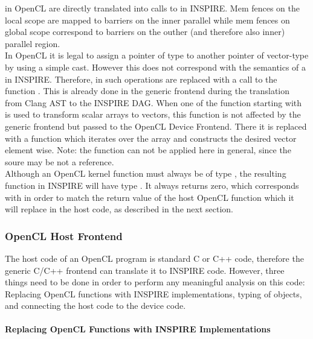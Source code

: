  in OpenCL are directly translated into calls to  in INSPIRE. Mem fences on the local scope are mapped to barriers on the inner parallel while mem fences on global scope correspond to barriers on the outher (and therefore also inner) parallel region. \\

In OpenCL it is legal to assign a pointer of type  to another pointer of vector-type  by using a simple cast. However this does not correspond with the semantics of a  in INSPIRE. Therefore, in such operations are replaced with a call to the function . This is already done in the generic frontend during the translation from Clang AST to the INSPIRE DAG. When one of the function starting with  is used to transform scalar arrays to vectors, this function is not affected by the generic frontend but passed to the OpenCL Device Frontend. There it is replaced with a function which iterates over the array and constructs the desired vector element wise. Note: the function  can not be applied here in general, since the soure may be not a reference. \\

Although an OpenCL kernel function must always be of type , the resulting function in INSPIRE will have type . It always returns zero, which corresponds with  in order to match the return value of the host OpenCL function  which it will replace in the host code, as described in the next section.


\subsubsection{OpenCL Host Frontend}
\label{sec:Insieme.HostCL}

The host code of an OpenCL program is standard C or C++ code, therefore the generic C/C++ frontend can translate it to INSPIRE code. However, three things need to be done in order to perform any meaningful analysis on this code: Replacing OpenCL functions with INSPIRE implementations, typing of  objects, and connecting the host code to the device code.

\paragraph{Replacing OpenCL Functions with INSPIRE Implementations}

